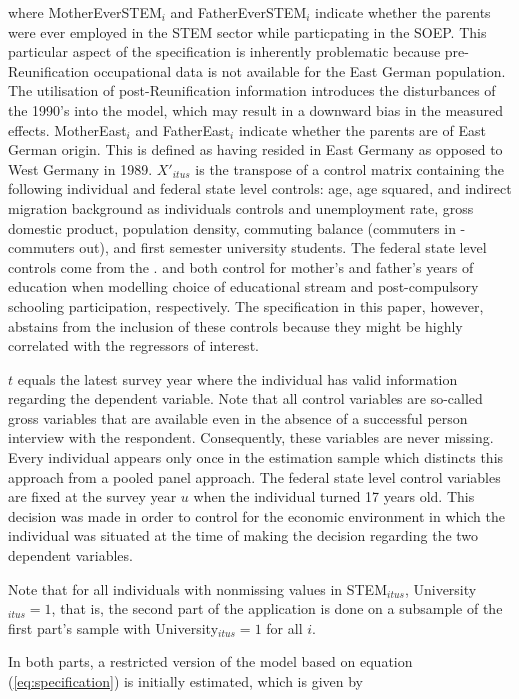 \documentclass[a4paper, oneside, hyperfootnotes = false]{article}
\begin{document}
{\noindent where MotherEverSTEM$_{i}$ and FatherEverSTEM$_{i}$ indicate whether the parents were ever employed in the STEM sector while particpating in the SOEP.
This particular aspect of the specification is inherently problematic because pre-Reunification occupational data is not available for the East German population.
The utilisation of post-Reunification information introduces the disturbances of the 1990's into the model, which may result in a downward bias in the measured effects.
MotherEast$_{i}$ and FatherEast$_{i}$ indicate whether the parents are of East German origin.
This is defined as having resided in East Germany as opposed to West Germany in 1989.
$X'_{itus}$ is the transpose of a control matrix containing the following individual and federal state level controls:
age, age squared, and indirect migration background as individuals controls and unemployment rate, gross domestic product, population density, commuting balance (commuters in - commuters out), and first semester university students.
The federal state level controls come from the \cite{INKAR2024}.
\cite{Sahoo2021} and \cite{Chevalier2013} both control for mother's and father's years of education when modelling choice of educational stream and post-compulsory schooling participation, respectively.
The specification in this paper, however, abstains from the inclusion of these controls because they might be highly correlated with the regressors of interest.

$t$ equals the latest survey year where the individual has valid information regarding the dependent variable.
Note that all control variables are so-called gross variables that are available even in the absence of a successful person interview with the respondent.
Consequently, these variables are never missing.
Every individual appears only once in the estimation sample which distincts this approach from a pooled panel approach.
The federal state level control variables are fixed at the survey year $u$ when the individual turned 17 years old.
This decision was made in order to control for the economic environment in which the individual was situated at the time of making the decision regarding the two dependent variables.

Note that for all individuals with nonmissing values in STEM$_{itus}$, University$_{itus} = 1$, that is, the second part of the application is done on a subsample of the first part's sample with University$_{itus} = 1$ for all $i$.

In both parts, a restricted version of the model based on equation (\ref{eq:specification}) is initially estimated, which is given by

}
\end{document}

